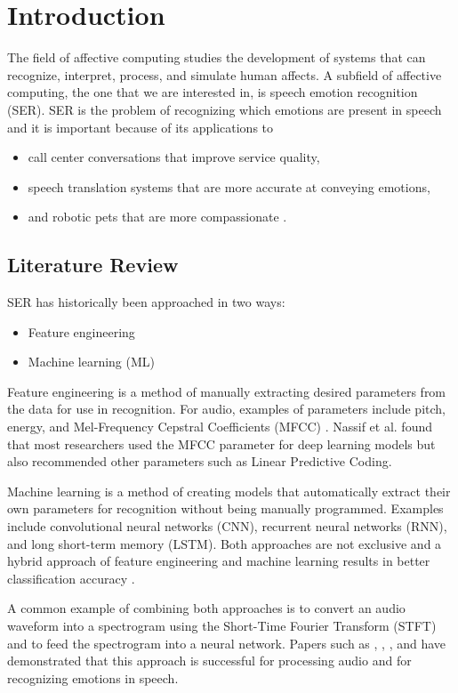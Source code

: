 \section{Introduction}

The field of affective computing studies the development of systems that can recognize, interpret, process, and simulate human affects. A subfield of affective computing, the one that we are interested in, is speech emotion recognition (SER). SER is the problem of recognizing which emotions are present in speech and it is important because of its applications to
\begin{itemize}
	\item call center conversations that improve service quality,
	\item speech translation systems that are more accurate at conveying emotions,
	\item and robotic pets that are more compassionate \cite{Koolagudi2012}.
\end{itemize}

\subsection{Literature Review}

SER has historically been approached in two ways:
\begin{itemize}
	\item Feature engineering
	\item Machine learning (ML)
\end{itemize}

Feature engineering is a method of manually extracting desired parameters from the data for use in  recognition. For audio, examples of parameters include pitch, energy, and Mel-Frequency Cepstral Coefficients (MFCC) \cite{Rybka2013}. Nassif et al. \cite{Nassif2019} found that most researchers used the MFCC parameter for deep learning models but also recommended other parameters such as Linear Predictive Coding. 

Machine learning is a method of creating models that automatically extract their own parameters for recognition without being manually programmed. Examples include convolutional neural networks (CNN), recurrent neural networks (RNN), and long short-term memory (LSTM). Both approaches are not exclusive and a hybrid approach of feature engineering and machine learning results in better classification accuracy \cite{Nassif2019}.

A common example of combining both approaches is to convert an audio waveform into a spectrogram using the Short-Time Fourier Transform (STFT) and to feed the spectrogram into a neural network. Papers such as \cite{Engel2019}, \cite{Chen2018}, \cite{Badshah2019}, and \cite{Zhao2019} have demonstrated that this approach is successful for processing audio and for recognizing emotions in speech.

